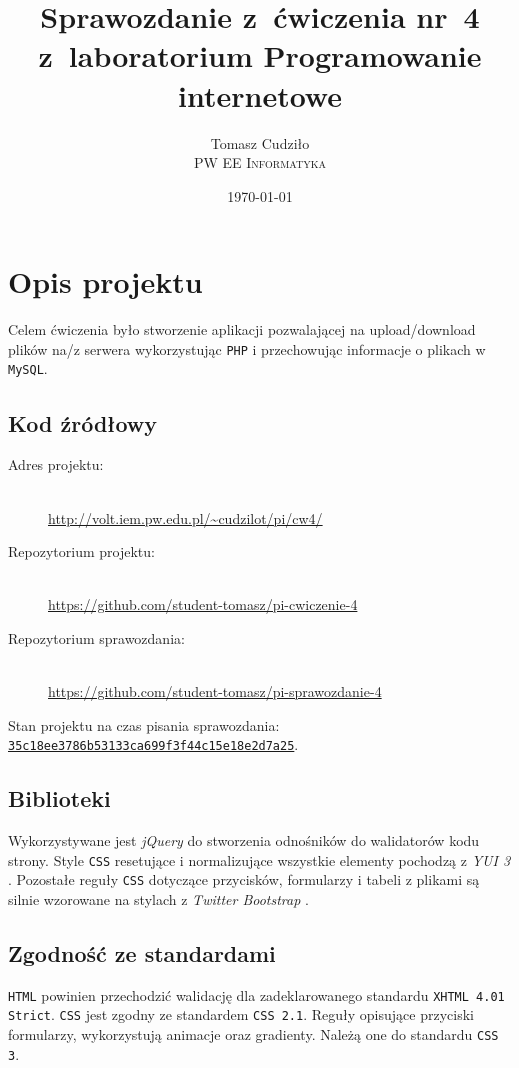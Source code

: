 \documentclass[10pt,a4paper]{article}
\newcommand{\f}[1]{\texttt{#1}}
\newcommand{\rev}{35c18ee3786b53133ca699f3f44c15e18e2d7a25}
\begin{document}
\title{
  Sprawozdanie z~ćwiczenia nr~4\\z~laboratorium Programowanie internetowe
}
\author{
  Tomasz Cudziło\\
  \textsc{PW EE Informatyka}\\[10pt]
}
\date{\today}
\maketitle



\section{Opis projektu}

Celem ćwiczenia było stworzenie aplikacji pozwalającej na upload/download plików
na/z serwera wykorzystując \f{PHP} i przechowując informacje o plikach w
\f{MySQL}.

\subsection{Kod źródłowy}
\begin{description}
  \item[Adres projektu:] \hfill \\
  \url{http://volt.iem.pw.edu.pl/~cudzilot/pi/cw4/}
  \item[Repozytorium projektu:] \hfill \\
  \url{https://github.com/student-tomasz/pi-cwiczenie-4}
  \item[Repozytorium sprawozdania:] \hfill \\
  \url{https://github.com/student-tomasz/pi-sprawozdanie-4}
\end{description}
Stan projektu na czas pisania sprawozdania:
\href{https://github.com/student-tomasz/pi-cwiczenie-4/tree/\rev}{\f{\rev}}.

\subsection{Biblioteki}
Wykorzystywane jest \emph{jQuery} \cite{jquery} do stworzenia odnośników do
walidatorów kodu strony. Style \f{CSS} resetujące i normalizujące wszystkie
elementy pochodzą z \emph{YUI 3} \cite{yui3}. Pozostałe reguły \f{CSS} dotyczące
przycisków, formularzy i tabeli z plikami są silnie wzorowane na stylach z
\emph{Twitter Bootstrap} \cite{bootstrap}.

\subsection{Zgodność ze standardami}
\f{HTML} powinien przechodzić walidację dla zadeklarowanego standardu \f{XHTML
4.01 Strict}. \f{CSS} jest zgodny ze standardem \f{CSS 2.1}. Reguły opisujące
przyciski formularzy, wykorzystują animacje oraz gradienty. Należą one do
standardu \f{CSS 3}.
\end{document}
